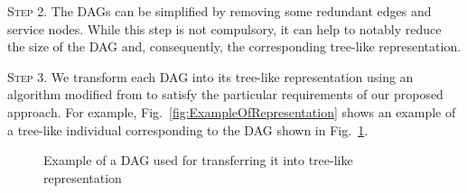 \textsc{Step 2}. The DAGs can be simplified by removing some redundant edges and service nodes. 
While this step is not compulsory, it can help to notably reduce the size of the DAG and, consequently, the corresponding tree-like representation. 

\textsc{Step 3}. 
We transform each DAG into its tree-like representation using an algorithm modified from \cite{da2016genetic} to satisfy the particular requirements of our proposed approach. For example, Fig.~\ref{fig:ExampleOfRepresentation} shows an example of a tree-like individual corresponding to the DAG shown in Fig.~\ref{fig:DAG}.


\begin{figure}[htb]
\centering
 \caption{Example of a DAG used for transferring it into tree-like representation}
 \label{fig:DAG}
\end{figure}


